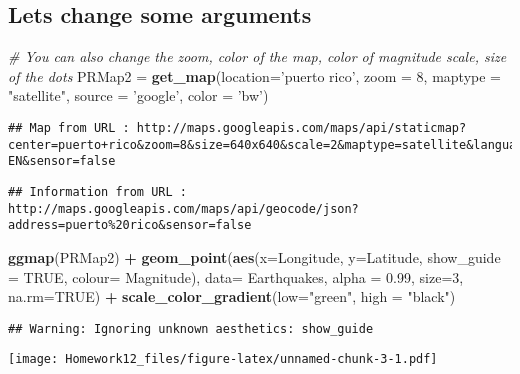 \documentclass[]{article}
\newenvironment{Shaded}{\begin{snugshade}}{\end{snugshade}}
\newcommand{\KeywordTok}[1]{\textcolor[rgb]{0.13,0.29,0.53}{\textbf{#1}}}
\newcommand{\DataTypeTok}[1]{\textcolor[rgb]{0.13,0.29,0.53}{#1}}
\newcommand{\DecValTok}[1]{\textcolor[rgb]{0.00,0.00,0.81}{#1}}
\newcommand{\FloatTok}[1]{\textcolor[rgb]{0.00,0.00,0.81}{#1}}
\newcommand{\StringTok}[1]{\textcolor[rgb]{0.31,0.60,0.02}{#1}}
\newcommand{\CommentTok}[1]{\textcolor[rgb]{0.56,0.35,0.01}{\textit{#1}}}
\newcommand{\OtherTok}[1]{\textcolor[rgb]{0.56,0.35,0.01}{#1}}
\newcommand{\OperatorTok}[1]{\textcolor[rgb]{0.81,0.36,0.00}{\textbf{#1}}}
\newcommand{\NormalTok}[1]{#1}
\begin{document}
\subsection{Lets change some
arguments}\label{lets-change-some-arguments}

\begin{Shaded}
\begin{Highlighting}[]
\CommentTok{# You can also change the zoom, color of the map, color of magnitude scale, size of the dots}
\NormalTok{PRMap2 =}\StringTok{ }\KeywordTok{get_map}\NormalTok{(}\DataTypeTok{location=}\StringTok{'puerto rico'}\NormalTok{, }\DataTypeTok{zoom =} \DecValTok{8}\NormalTok{, }\DataTypeTok{maptype =} \StringTok{"satellite"}\NormalTok{, }\DataTypeTok{source =} \StringTok{'google'}\NormalTok{, }\DataTypeTok{color =} \StringTok{'bw'}\NormalTok{)}
\end{Highlighting}
\end{Shaded}

\begin{verbatim}
## Map from URL : http://maps.googleapis.com/maps/api/staticmap?center=puerto+rico&zoom=8&size=640x640&scale=2&maptype=satellite&language=en-EN&sensor=false
\end{verbatim}

\begin{verbatim}
## Information from URL : http://maps.googleapis.com/maps/api/geocode/json?address=puerto%20rico&sensor=false
\end{verbatim}

\begin{Shaded}
\begin{Highlighting}[]
\KeywordTok{ggmap}\NormalTok{(PRMap2) }\OperatorTok{+}\StringTok{ }\KeywordTok{geom_point}\NormalTok{(}\KeywordTok{aes}\NormalTok{(}\DataTypeTok{x=}\NormalTok{Longitude, }\DataTypeTok{y=}\NormalTok{Latitude, }\DataTypeTok{show_guide =} \OtherTok{TRUE}\NormalTok{, }\DataTypeTok{colour=}\NormalTok{ Magnitude),}
                  \DataTypeTok{data=}\NormalTok{ Earthquakes, }\DataTypeTok{alpha =} \FloatTok{0.99}\NormalTok{, }\DataTypeTok{size=}\DecValTok{3}\NormalTok{, }\DataTypeTok{na.rm=}\OtherTok{TRUE}\NormalTok{) }\OperatorTok{+}\StringTok{ }\KeywordTok{scale_color_gradient}\NormalTok{(}\DataTypeTok{low=}\StringTok{"green"}\NormalTok{, }\DataTypeTok{high =} \StringTok{"black"}\NormalTok{) }
\end{Highlighting}
\end{Shaded}

\begin{verbatim}
## Warning: Ignoring unknown aesthetics: show_guide
\end{verbatim}

\texttt{[image: Homework12\_files/figure-latex/unnamed-chunk-3-1.pdf]}
\end{document}
